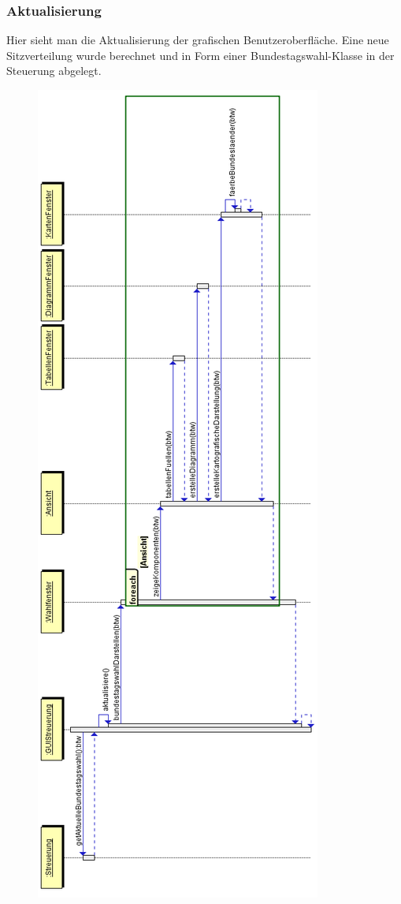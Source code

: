 \documentclass[12pt,a4paper,titlepage]{article}
\begin{document}
\subsubsection{Aktualisierung}
Hier sieht man die Aktualisierung der grafischen Benutzeroberfläche. Eine neue Sitzverteilung wurde berechnet und in Form einer Bundestagswahl-Klasse in der Steuerung abgelegt. \\
\begin{figure}[!ht]
\centering
\includegraphics[scale=0.5]{GUI_Aktualisierung.png}
\end{figure}
\end{document}
